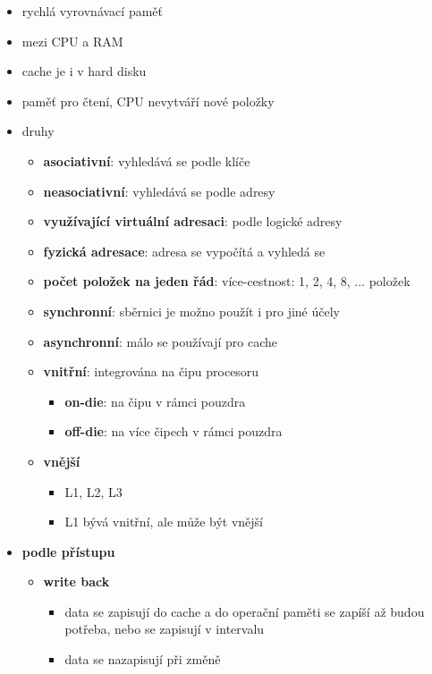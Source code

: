\documentclass[a4paper,12pt]{article}
\providecommand{\tightlist}{%
\setlength{\itemsep}{0pt}\setlength{\parskip}{0pt}}
\begin{document}
\begin{itemize}
  \tightlist
  \item rychlá vyrovnávací paměť
  \item mezi CPU a RAM
  \item cache je i v hard disku
  \item paměť pro čtení, CPU nevytváří nové položky
  \item druhy
  \begin{itemize}
    \tightlist
    \item \textbf{asociativní}: vyhledává se podle klíče
    \item \textbf{neasociativní}: vyhledává se podle adresy
    \item \textbf{využívající virtuální adresaci}: podle logické adresy
    \item \textbf{fyzická adresace}: adresa se vypočítá a vyhledá se
    \item \textbf{počet položek na jeden řád}: více-cestnost: 1, 2, 4, 8, ...
    položek
    \item \textbf{synchronní}: sběrnici je možno použít i pro jiné účely
    \item \textbf{asynchronní}: málo se používají pro cache
    \item \textbf{vnitřní}: integrována na čipu procesoru
    \begin{itemize}
      \tightlist
      \item \textbf{on-die}: na čipu v rámci pouzdra
      \item \textbf{off-die}: na více čipech v rámci pouzdra
    \end{itemize}
    \item \textbf{vnější}
    \begin{itemize}
      \tightlist
      \item L1, L2, L3
      \item L1 bývá vnitřní, ale může být vnější
    \end{itemize}
  \end{itemize}
  \item \textbf{podle přístupu}
  \begin{itemize}
    \tightlist
    \item \textbf{write back}
    \begin{itemize}
      \tightlist
      \item data se zapisují do cache a do operační paměti se zapíší až budou
      potřeba, nebo se zapisují v intervalu
      \item data se nazapisují při změně

\end{itemize}
\end{itemize}
\end{itemize}
\end{document}
